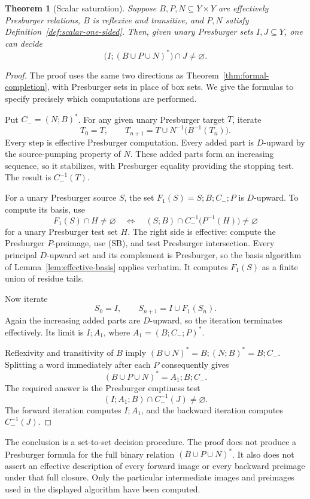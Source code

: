 \documentclass[11pt,a4paper]{article}
\newtheorem{theorem}{Theorem}[section]
\theoremstyle{definition}
\theoremstyle{remark}
\begin{document}
\begin{theorem}[Scalar saturation]
\label{thm:formal-scalar}
Suppose \(B,P,N\subseteq Y\times Y\) are effectively Presburger
relations, \(B\) is reflexive and transitive, and \(P,N\) satisfy
Definition~\ref{def:scalar-one-sided}. Then, given unary Presburger
sets \(I,J\subseteq Y\), one can decide
\[
 \bigl(I;(B\cup P\cup N)^*\bigr)\cap J\neq\varnothing.
\]
\end{theorem}
\begin{proof}
The proof uses the same two directions as
Theorem~\ref{thm:formal-completion}, with Presburger sets in place of
box sets. We give the formulas to specify precisely which computations
are performed.

Put \(C_-=(N;B)^*\). For any given unary Presburger target \(T\),
iterate
\[
 T_0=T,\qquad
 T_{n+1}=T\cup N^{-1}\bigl(B^{-1}(T_n)\bigr).
 \tag{SB}
\]
Every step is effective Presburger computation. Every added part is
\(D\)-upward by the source-pumping property of \(N\). These added
parts form an increasing sequence, so it stabilizes, with Presburger
equality providing the stopping test. The result is
\(C_-^{-1}(T)\).

For a unary Presburger source \(S\), the set
\(F_1(S)=S;B;C_-;P\) is \(D\)-upward. To compute its basis, use
\[
 F_1(S)\cap H\neq\varnothing
 \quad\Longleftrightarrow\quad
 (S;B)\cap C_-^{-1}\bigl(P^{-1}(H)\bigr)\neq\varnothing
 \tag{SQ}
\]
for a unary Presburger test set \(H\). The right side is effective:
compute the Presburger \(P\)-preimage, use (SB), and test Presburger
intersection. Every principal \(D\)-upward set and its complement is
Presburger, so the basis algorithm of
Lemma~\ref{lem:effective-basis} applies verbatim.
It computes \(F_1(S)\) as a finite union of residue tails.

Now iterate
\[
 S_0=I,\qquad S_{n+1}=I\cup F_1(S_n).
 \tag{SF}
\]
Again the increasing added parts are \(D\)-upward, so the iteration
terminates effectively. Its limit is \(I;A_1\), where
\(A_1=(B;C_-;P)^*\).

Reflexivity and transitivity of \(B\) imply
\((B\cup N)^*=B;(N;B)^*=B;C_-\).
Splitting a word immediately after each \(P\) consequently gives
\[
 (B\cup P\cup N)^*=A_1;B;C_-.
\]
The required answer is the Presburger emptiness test
\[
 (I;A_1;B)\cap C_-^{-1}(J)\neq\varnothing.
\]
The forward iteration computes \(I;A_1\), and the backward iteration
computes \(C_-^{-1}(J)\).
\end{proof}

The conclusion is a set-to-set decision procedure. The proof does not
produce a Presburger formula for the full binary relation
\((B\cup P\cup N)^*\). It also does not assert an effective description
of every forward image or every backward preimage under that full
closure. Only the particular intermediate images and preimages used
in the displayed algorithm have been computed.
\end{document}

